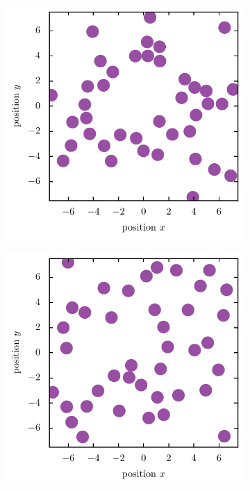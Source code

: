 \documentclass[11pt, a4paper]{article}
\numberwithin{equation}{section}
\begin{document}
\begin{figure}[h]
\begin{subfigure}[t]{0.48\textwidth}
		\label{fig:lj_single_cluster}
		\vspace*{0.3cm}
	\end{subfigure}
	\begin{subfigure}[t]{0.48\textwidth}
		\centering
		\includegraphics[width=\textwidth]{figures/Beta_5_LJ.pdf}
		\label{fig:lj_chain}
		\vspace*{0.3cm}
	\end{subfigure}
	\hfill
	\begin{subfigure}[t]{0.48\textwidth}
		\centering
		\includegraphics[width=\textwidth]{figures/Beta_1_LJ.pdf}

\end{subfigure}
\end{figure}
\end{document}
